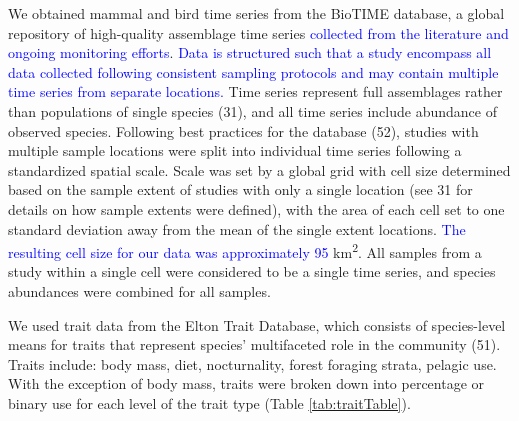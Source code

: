 \documentclass{article}
\begin{document}
We obtained mammal and bird time series from the BioTIME database, a
global repository of high-quality assemblage time series
\textcolor{blue}{collected from the literature and ongoing monitoring efforts}.
\textcolor{blue}{Data is structured such that a study encompass all data collected following consistent sampling protocols and may contain multiple time series from separate locations.}
Time series represent full assemblages rather than populations of single
species (31), and all time series include abundance of observed species.
Following best practices for the database (52), studies with multiple
sample locations were split into individual time series following a
standardized spatial scale. Scale was set by a global grid with cell
size determined based on the sample extent of studies with only a single
location (see 31 for details on how sample extents were defined), with
the area of each cell set to one standard deviation away from the mean
of the single extent locations.
\textcolor{blue}{The resulting cell size for our data was approximately 95 }km\textsuperscript{2}.
All samples from a study within a single cell were considered to be a
single time series, and species abundances were combined for all
samples.

We used trait data from the Elton Trait Database, which consists of
species-level means for traits that represent species' multifaceted role
in the community (51). Traits include: body mass, diet, nocturnality,
forest foraging strata, pelagic use. With the exception of body mass,
traits were broken down into percentage or binary use for each level of
the trait type (Table \ref{tab:traitTable}).
\end{document}
